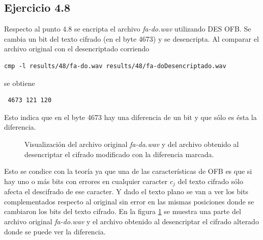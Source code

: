 \documentclass[a4paper,10pt]{article}
\begin{document}
\subsection{Ejercicio 4.8}
Respecto al punto 4.8 se encripta el archivo \emph{fa-do.wav} utilizando DES OFB.
Se cambia un bit del texto cifrado (en el byte 4673) y se desencripta. Al comparar
el archivo original con el desencriptado corriendo
\begin{lstlisting}
cmp -l results/48/fa-do.wav results/48/fa-doDesencriptado.wav 
\end{lstlisting}
se obtiene 
\begin{lstlisting}
 4673 121 120
\end{lstlisting}
Esto indica que en el byte 4673 hay una diferencia de un bit y que s\'olo es \'esta la diferencia.
\begin{figure}
	\begin{center}
	\end{center}
	\caption{Visualización del archivo original \emph{fa-da.wav} y del archivo obtenido 
		al desencriptar el cifrado modificado con la diferencia marcada.}
	\label{fig:48}
\end{figure}
Esto se condice con la teor\'ia ya que una de las caracter\'isticas de OFB es que si
hay uno o m\'as bits con errores en cualquier caracter $ c_{j} $ del texto cifrado s\'olo afecta el descifrado de ese caracter. Y dado el texto plano se van a ver
los bits complementados respecto al original sin error en las mismas posiciones donde 
se cambiaron los bits del texto cifrado. En la figura \ref{fig:48} se muestra una 
parte del archivo original \emph{fa-do.wav} y el archivo obtenido al desencriptar
el cifrado alterado donde se puede ver la diferencia.
\end{document}

